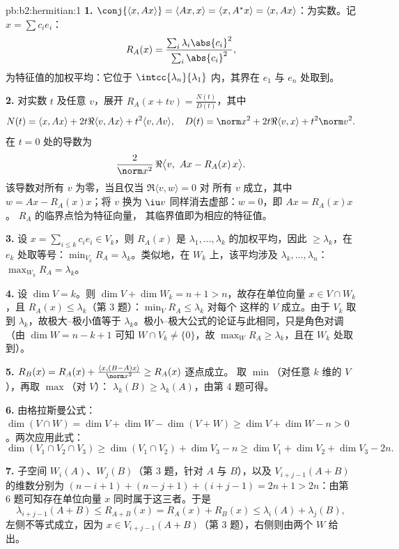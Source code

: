 \begin{solution}{pb:b2:hermitian:1}
\textbf{1.} $\conj{\langle x, Ax\rangle} = \langle Ax, x\rangle
= \langle x, A^*x\rangle = \langle x, Ax\rangle$：为实数。记
$x = \sum c_ie_i$：
\[
R_A(x) = \frac{\sum_i\lambda_i\abs{c_i}^2}
{\sum_i\abs{c_i}^2} ,
\]
为特征值的加权平均：它位于
$\intcc{\lambda_n}{\lambda_1}$ 内，其界在
$e_1$ 与 $e_n$ 处取到。

\textbf{2.} 对实数 $t$ 及任意 $v$，展开 $R_A(x + tv) =
\frac{N(t)}{D(t)}$，其中
\[
N(t) = \langle x, Ax\rangle + 2t\Re\langle v, Ax\rangle +
t^2\langle v, Av\rangle,
\quad
D(t) = \norm x^2 + 2t\Re\langle v, x\rangle + t^2\norm v^2 .
\]
在 $t = 0$ 处的导数为
\[
\frac{2}{\norm x^2}\,
\Re\bigl\langle v,\ Ax - R_A(x)\,x\bigr\rangle .
\]
该导数对所有 $v$ 为零，当且仅当 $\Re\langle v, w\rangle = 0$ 对
所有 $v$ 成立，其中 $w = Ax - R_A(x)x$；将 $v$ 换为 $\iu v$
同样消去虚部：$w = 0$，即 $Ax = R_A(x)x$。
$R_A$ 的临界点恰为特征向量，
其临界值即为相应的特征值。

\textbf{3.} 设 $x = \sum_{i\leq k}c_ie_i \in V_k$，则 $R_A(x)$ 是
$\lambda_1, \dots, \lambda_k$ 的加权平均，因此
$\geq \lambda_k$，在 $e_k$ 处取等号：$\min_{V_k} R_A =
\lambda_k$。类似地，在 $W_k$ 上，该平均涉及
$\lambda_k, \dots, \lambda_n$：$\max_{W_k}R_A = \lambda_k$。

\textbf{4.} 设 $\dim V = k$。则 $\dim V + \dim W_k = n + 1 >
n$，故存在单位向量 $x \in V \cap W_k$，且 $R_A(x) \leq
\lambda_k$（第 3 题）：$\min_{V}R_A \leq \lambda_k$ 对每个
这样的 $V$ 成立。由于 $V_k$ 取到 $\lambda_k$，故极大–极小值等于
$\lambda_k$。极小–极大公式的论证与此相同，只是角色对调
（由 $\dim W = n - k + 1$ 可知 $W \cap V_k \neq
\{0\}$，故 $\max_W R_A \geq \lambda_k$，且在 $W_k$ 处取到）。

\textbf{5.} $R_B(x) = R_A(x) + \frac{\langle x,
(B-A)x\rangle}{\norm x^2} \geq R_A(x)$ 逐点成立。
取 $\min$（对任意 $k$ 维的 $V$），再取 $\max$（对 $V$）：
$\lambda_k(B) \geq \lambda_k(A)$，由第 4 题可得。

\textbf{6.} 由格拉斯曼公式：$\dim(V\cap W) = \dim V + \dim W -
\dim(V + W) \geq \dim V + \dim W - n > 0$。两次应用此式：
\[
\dim(V_1\cap V_2\cap V_3)
\geq \dim(V_1\cap V_2) + \dim V_3 - n
\geq \dim V_1 + \dim V_2 + \dim V_3 - 2n .
\]

\textbf{7.} 子空间 $W_i(A)$、$W_j(B)$（第 3 题，针对
$A$ 与 $B$），以及 $V_{i+j-1}(A+B)$ 的维数分别为 $(n-i+1) +
(n-j+1) + (i+j-1) = 2n + 1 > 2n$：由第 6 题可知存在单位向量
$x$ 同时属于这三者。于是
\[
\lambda_{i+j-1}(A+B) \leq R_{A+B}(x)
= R_A(x) + R_B(x) \leq \lambda_i(A) + \lambda_j(B),
\]
左侧不等式成立，因为 $x \in V_{i+j-1}(A+B)$（第
3 题），右侧则由两个 $W$ 给出。


\end{solution}
